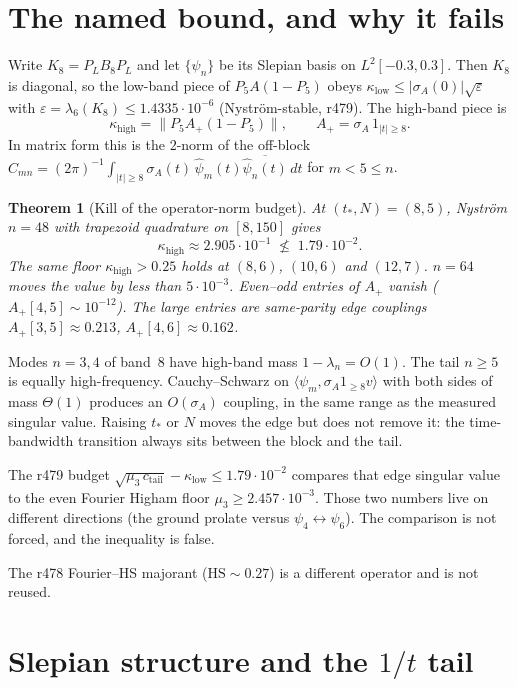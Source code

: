 \documentclass[11pt]{article}
\newtheorem{theorem}{Theorem}
\theoremstyle{remark}
\begin{document}
\section{The named bound, and why it fails}

Write $K_8=P_LB_8P_L$ and let $\{\psi_n\}$ be its Slepian basis
on $L^2[-0.3,0.3]$.  Then $K_8$ is diagonal,
so the low-band piece of $P_5A(1-P_5)$ obeys
$\kappa_{\mathrm{low}}\le|\sigma_A(0)|\sqrt{\varepsilon}$
with $\varepsilon=\lambda_6(K_8)\le1.4335\cdot10^{-6}$
(Nystr\"om-stable, r479).
The high-band piece is
\[
 \kappa_{\mathrm{high}}
 =\bigl\|P_5A_+(1-P_5)\bigr\|,
 \qquad
 A_+=\sigma_A\,1_{|t|\ge8}.
\]
In matrix form this is the $2$-norm of the off-block
$C_{mn}=(2\pi)^{-1}\int_{|t|\ge8}\sigma_A(t)\,\widehat\psi_m(t)
\overline{\widehat\psi_n(t)}\,dt$
for $m<5\le n$.

\begin{theorem}[Kill of the operator-norm budget]\label{thm:kill}
At $(t_*,N)=(8,5)$, Nystr\"om $n=48$ with trapezoid quadrature
on $[8,150]$ gives
\[
 \kappa_{\mathrm{high}}\approx2.905\cdot10^{-1}
 \;\not\le\;
 1.79\cdot10^{-2}.
\]
The same floor $\kappa_{\mathrm{high}}>0.25$ holds at
$(8,6)$, $(10,6)$ and $(12,7)$.
$n=64$ moves the value by less than $5\cdot10^{-3}$.
Even--odd entries of $A_+$ vanish
($A_+[4,5]\sim10^{-12}$).
The large entries are same-parity edge couplings
$A_+[3,5]\approx0.213$, $A_+[4,6]\approx0.162$.
\end{theorem}

Modes $n=3,4$ of band~$8$ have high-band mass $1-\lambda_n=O(1)$.
The tail $n\ge5$ is equally high-frequency.
Cauchy--Schwarz on
$\langle\psi_m,\sigma_A1_{\ge8}v\rangle$
with both sides of mass $\Theta(1)$ produces an $O(\sigma_A)$
coupling, in the same range as the measured singular value.
Raising $t_*$ or $N$ moves the edge but does not remove it:
the time-bandwidth transition always sits between the block
and the tail.

The r479 budget
$\sqrt{\mu_3\,c_{\mathrm{tail}}}-\kappa_{\mathrm{low}}\le1.79\cdot10^{-2}$
compares that edge singular value to the even Fourier
Higham floor $\mu_3\ge2.457\cdot10^{-3}$.
Those two numbers live on different directions
(the ground prolate versus $\psi_4\leftrightarrow\psi_6$).
The comparison is not forced, and the inequality is false.

The r478 Fourier--HS majorant ($\mathrm{HS}\sim0.27$) is a
different operator and is not reused.

\section{Slepian structure and the $1/t$ tail}
\end{document}
